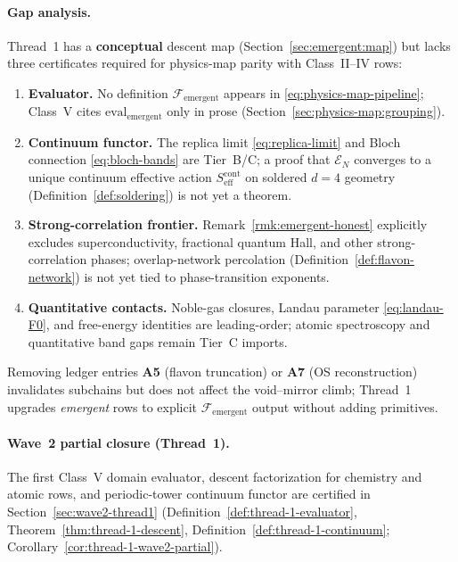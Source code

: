 \paragraph{Gap analysis.}
Thread~1 has a \textbf{conceptual} descent map (Section~\ref{sec:emergent:map})
but lacks three certificates required for physics-map parity with
Class~II--IV rows:
\begin{enumerate}[label=(\roman*),leftmargin=*]
  \item \textbf{Evaluator.} No definition
    $\mathcal{F}_{\mathrm{emergent}}$ appears in
    \eqref{eq:physics-map-pipeline}; Class~V cites
    $\mathrm{eval}_{\mathrm{emergent}}$ only in prose
    (Section~\ref{sec:physics-map:grouping}).
  \item \textbf{Continuum functor.} The replica limit
    \eqref{eq:replica-limit} and Bloch connection
    \eqref{eq:bloch-bands} are Tier~B/C; a proof that
    $\mathcal{E}_N$ converges to a unique continuum effective action
    $S_{\mathrm{eff}}^{\mathrm{cont}}$ on soldered $d=4$ geometry
    (Definition~\ref{def:soldering}) is not yet a theorem.
  \item \textbf{Strong-correlation frontier.}
    Remark~\ref{rmk:emergent-honest} explicitly excludes superconductivity,
    fractional quantum Hall, and other strong-correlation phases; overlap-network
    percolation (Definition~\ref{def:flavon-network}) is not yet tied to
    phase-transition exponents.
  \item \textbf{Quantitative contacts.} Noble-gas closures, Landau parameter
    \eqref{eq:landau-F0}, and free-energy identities are leading-order;
    atomic spectroscopy and quantitative band gaps remain Tier~C imports.
\end{enumerate}
Removing ledger entries \textbf{A5} (flavon truncation) or \textbf{A7} (OS
reconstruction) invalidates subchains but does not affect the void--mirror
climb; Thread~1 upgrades \emph{emergent} rows to explicit
$\mathcal{F}_{\mathrm{emergent}}$ output without adding primitives.

\paragraph{Wave~2 partial closure (Thread~1).}
The first Class~V domain evaluator, descent factorization for chemistry and
atomic rows, and periodic-tower continuum functor are certified in
Section~\ref{sec:wave2-thread1}
(Definition~\ref{def:thread-1-evaluator},
Theorem~\ref{thm:thread-1-descent},
Definition~\ref{def:thread-1-continuum};
Corollary~\ref{cor:thread-1-wave2-partial}).

